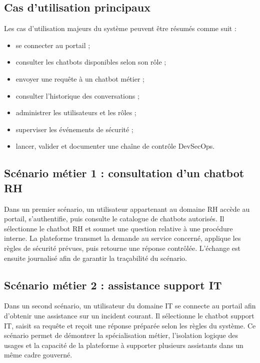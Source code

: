 \subsection{Cas d’utilisation principaux}

Les cas d’utilisation majeurs du système peuvent être résumés comme suit :

\begin{itemize}
    \item se connecter au portail ;
    \item consulter les chatbots disponibles selon son rôle ;
    \item envoyer une requête à un chatbot métier ;
    \item consulter l’historique des conversations ;
    \item administrer les utilisateurs et les rôles ;
    \item superviser les événements de sécurité ;
    \item lancer, valider et documenter une chaîne de contrôle DevSecOps.
\end{itemize}

\subsection{Scénario métier 1 : consultation d’un chatbot RH}

Dans un premier scénario, un utilisateur appartenant au domaine RH accède au portail, s’authentifie, puis consulte le catalogue de chatbots autorisés. Il sélectionne le chatbot RH et soumet une question relative à une procédure interne. La plateforme transmet la demande au service concerné, applique les règles de sécurité prévues, puis retourne une réponse contrôlée. L’échange est ensuite journalisé afin de garantir la traçabilité du scénario.

\subsection{Scénario métier 2 : assistance support IT}

Dans un second scénario, un utilisateur du domaine IT se connecte au portail afin d’obtenir une assistance sur un incident courant. Il sélectionne le chatbot support IT, saisit sa requête et reçoit une réponse préparée selon les règles du système. Ce scénario permet de démontrer la spécialisation métier, l’isolation logique des usages et la capacité de la plateforme à supporter plusieurs assistants dans un même cadre gouverné.

